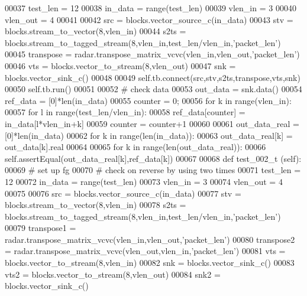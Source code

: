 \begin{DoxyCode}
00037         test\_len = 12
00038         in\_data = range(test\_len)
00039         vlen\_in = 3
00040         vlen\_out = 4
00041         
00042         src = blocks.vector\_source\_c(in\_data)
00043         stv = blocks.stream\_to\_vector(8,vlen\_in)
00044         s2ts = blocks.stream\_to\_tagged\_stream(8,vlen\_in,test\_len/vlen\_in,\textcolor{stringliteral}{'packet\_len'})
00045         transpose = radar.transpose\_matrix\_vcvc(vlen\_in,vlen\_out,\textcolor{stringliteral}{'packet\_len'})
00046         vts = blocks.vector\_to\_stream(8,vlen\_out)
00047         snk = blocks.vector\_sink\_c()
00048         
00049         self.tb.connect(src,stv,s2ts,transpose,vts,snk)
00050         self.tb.run()
00051         
00052         \textcolor{comment}{# check data}
00053         out\_data = snk.data()
00054         ref\_data = [0]*len(in\_data)
00055         counter = 0;
00056         \textcolor{keywordflow}{for} k \textcolor{keywordflow}{in} range(vlen\_in):
00057             \textcolor{keywordflow}{for} l \textcolor{keywordflow}{in} range(test\_len/vlen\_in):
00058                 ref\_data[counter] = in\_data[l*vlen\_in+k]
00059                 counter = counter+1
00060             
00061         out\_data\_real = [0]*len(in\_data)
00062         \textcolor{keywordflow}{for} k \textcolor{keywordflow}{in} range(len(in\_data)):
00063             out\_data\_real[k] = out\_data[k].real
00064                 
00065         \textcolor{keywordflow}{for} k \textcolor{keywordflow}{in} range(len(out\_data\_real)):
00066             self.assertEqual(out\_data\_real[k],ref\_data[k])
00067             
00068     \textcolor{keyword}{def }test_002_t (self):
00069         \textcolor{comment}{# set up fg}
00070         \textcolor{comment}{# check on reverse by using two times}
00071         test\_len = 12
00072         in\_data = range(test\_len)
00073         vlen\_in = 3
00074         vlen\_out = 4
00075         
00076         src = blocks.vector\_source\_c(in\_data)
00077         stv = blocks.stream\_to\_vector(8,vlen\_in)
00078         s2ts = blocks.stream\_to\_tagged\_stream(8,vlen\_in,test\_len/vlen\_in,\textcolor{stringliteral}{'packet\_len'})
00079         transpose1 = radar.transpose\_matrix\_vcvc(vlen\_in,vlen\_out,\textcolor{stringliteral}{'packet\_len'})
00080         transpose2 = radar.transpose\_matrix\_vcvc(vlen\_out,vlen\_in,\textcolor{stringliteral}{'packet\_len'})
00081         vts = blocks.vector\_to\_stream(8,vlen\_in)
00082         snk = blocks.vector\_sink\_c()
00083         vts2 = blocks.vector\_to\_stream(8,vlen\_out)
00084         snk2 = blocks.vector\_sink\_c()

\end{DoxyCode}

